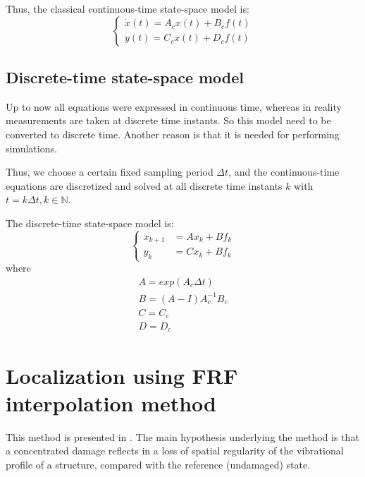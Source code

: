\documentclass[journal]{IEEEtran}
\begin{document}
Thus, the classical continuous-time state-space model is:
\begin{equation}
\left\{
\begin{array}{ll}
\dot{x}(t) = A_cx(t) + B_cf(t) \\
y(t) = C_cx(t) + D_cf(t)
\end{array}
\right.
\end{equation}

\subsection{Discrete-time state-space model} %

Up to now all equations were expressed in continuous time, whereas in reality
measurements are taken at discrete time instants.
So this model need to be converted to discrete time.
Another reason is that it is needed for performing simulations.

Thus, we choose a certain fixed sampling period $\Delta t$, and the continuous-time equations are discretized and solved at all
discrete time instants $k$ with $t = k \Delta t, k \in \mathbb{N}$.

The discrete-time state-space model is:
\begin{equation}
\left\{
\begin{array}{ll}
x_{k+1} & = Ax_k + Bf_k \\
y_k & = Cx_k + Bf_k
\end{array}
\right.
\label{discrete}
\end{equation}
where
\begin{equation}
\begin{array}{ll}
A = exp(A_c \Delta t) \\
B= (A - I) A^{-1}_c B_c \\
C = C_c \\
D = D_c
\end{array}
\end{equation}





\section{Localization using FRF interpolation method}

This method is presented in \cite{dilena2015damage}.
The main hypothesis underlying the method is that a concentrated damage reflects in a loss of spatial regularity of the
vibrational profile of a structure, compared with the reference (undamaged) state.
\end{document}
